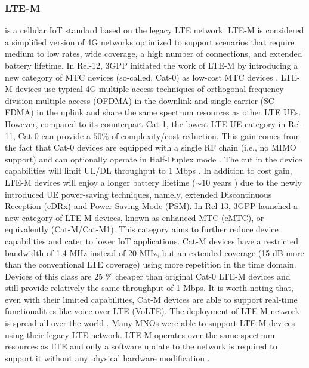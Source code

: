 \documentclass[]{IEEEtran}
\begin{document}
\subsubsection{LTE-M}
\label{sec:2-2-2}
is a cellular IoT standard based on the legacy LTE network. LTE-M is considered a simplified version of 4G networks optimized to support scenarios that require medium to low rates, wide coverage, a high number of connections, and extended battery lifetime\cite{benhiba_comparative_2018}.
In Rel-12, 3GPP initiated the work of LTE-M by introducing a new category of MTC devices (so-called, Cat-0) as low-cost MTC devices \cite{rico2016overview}. LTE-M devices use typical 4G multiple access techniques of orthogonal frequency division multiple access (OFDMA) in the downlink and single carrier (SC-FDMA) in the uplink and share the same spectrum resources as other LTE UEs\cite{ding_iot_2020}. However, compared to its counterpart Cat-1, the lowest LTE UE category in Rel-11, Cat-0 can provide a $50\%$ of complexity/cost reduction\cite{sharma2019toward}. This gain comes from the fact that Cat-0 devices are equipped with a single RF chain (i.e., no MIMO support) and can optionally operate in Half-Duplex mode \cite{liberg_cellular_2019}. The cut in the device capabilities will limit UL/DL throughput to 1 Mbps \cite{wang_information_2021}. In addition to cost gain, LTE-M devices will enjoy a longer battery lifetime ($\sim$10 years \cite{GSM_white_2018}) due to the newly introduced UE power-saving techniques, namely, extended Discontinuous Reception (eDRx) and Power Saving Mode (PSM)\cite{raza2017low}.
In Rel-13, 3GPP launched a new category of LTE-M devices, known as enhanced MTC (eMTC), or equivalently (Cat-M/Cat-M1). This category aims to further reduce device capabilities and cater to lower IoT applications. Cat-M devices have a restricted bandwidth of 1.4 MHz instead of 20 MHz, but an extended coverage (15 dB more than the conventional LTE coverage\cite{xu_narrowband_2018_3}) using more repetition in the time domain. Devices of this class are 25 $\%$  cheaper than original Cat-0 LTE-M devices and still provide relatively the same throughput of 1 Mbps\cite{herrero_fundamentals_2021}. It is worth noting that, even with their limited capabilities, Cat-M devices are able to support real-time functionalities like voice over LTE (VoLTE)\cite{foubert2020long}.
The deployment of LTE-M network is spread all over the world \cite{foubert2020long}. Many MNOs were able to support LTE-M devices using their legacy LTE network. LTE-M operates over the same spectrum resources as LTE and only a software update to the network is required to support it without any physical hardware modification \cite{chaudhari2020lpwan}.
\end{document}
